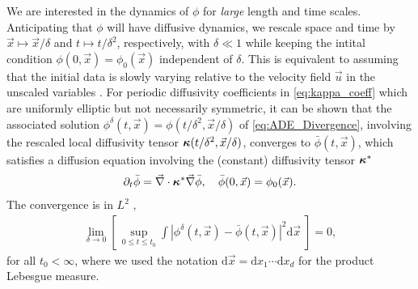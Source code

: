 \documentclass[11pt]{amsart}
\renewcommand{\d}{\mathrm{d}}
\newcommand\bkappa{\mbox{\boldmath${\kappa}$}}
\begin{document}
We are interested in the dynamics of $\phi$ for \emph{large} length and
time scales. Anticipating that $\phi$ will have diffusive dynamics, we
rescale space and time by $\vec{x}\mapsto\vec{x}/\delta$ and $t\mapsto t/\delta^2$,
respectively, with $\delta\ll1$ while keeping the intital condition
$\phi(0,\vec{x})=\phi_0(\vec{x})$ independent 
of $\delta$. This is equivalent to assuming that the initial data is slowly
varying relative to the velocity field $\vec{u}$ in the unscaled
variables
\cite{McLaughlin:SIAM_JAM:780,Fannjiang:SIAM_JAM:333,Fannjiang:1997:1033}. 
For periodic diffusivity coefficients in \eqref{eq:kappa_coeff} which
are uniformly elliptic but not necessarily symmetric, it can be shown 
\cite{Fannjiang:SIAM_JAM:333} that the associated solution
$\phi^\delta(t,\vec{x})=\phi(t/\delta^2,\vec{x}/\delta)$  of \eqref{eq:ADE_Divergence},
involving the rescaled local diffusivity tensor
$\bkappa(t/\delta^2,\vec{x}/\delta)$, converges to $\bar{\phi}(t,\vec{x})$, which
satisfies a diffusion equation involving the (constant)
diffusivity tensor $\bkappa^*$
%
\begin{align}
  \partial_t\bar{\phi}=\vec{\nabla}\cdot\bkappa^*\vec{\nabla}\bar{\phi}, \quad
  \bar{\phi}(0,\vec{x})=\phi_0(\vec{x}).
\end{align}
%
The convergence is in $L^2$ \cite{Fannjiang:SIAM_JAM:333},
%
\begin{align}
  \lim_{\delta\to0}\left[\,\sup_{0\leq t\leq t_0}
    \int\left|\phi^\delta(t,\vec{x})-\bar{\phi}(t,\vec{x})\right|^2\d\vec{x}
    \;\right]=0,
\end{align}
%
for all $t_0<\infty$, where we used the notation $\d\vec{x}=\d x_1\cdots \d x_d$ for
the product Lebesgue measure.
\end{document}
